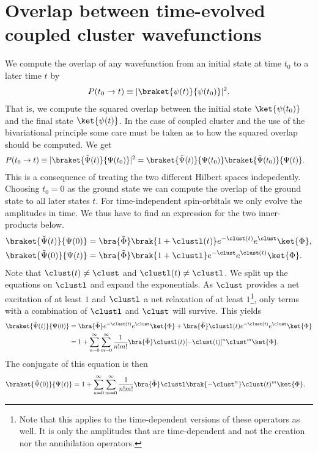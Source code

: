 \chapter{Overlap between time-evolved coupled cluster wavefunctions}
    We compute the overlap of any wavefunction from an initial state at time
    $t_0$ to a later time $t$ by
    \begin{align}
        P(t_0 \to t)
        \equiv |\braket{\psi(t)}{\psi(t_0)}|^2.
    \end{align}
    That is, we compute the squared overlap between the initial state
    $\ket{\psi(t_0)}$ and the final state $\ket{\psi(t)}$. In the case of
    coupled cluster and the use of the bivariational principle some care must be
    taken as to how the squared overlap should be computed. We get
    \begin{align}
        P(t_0 \to t)
        &\equiv |\braket{\tilde{\Psi}(t)}{\Psi(t_0)}|^2
        = \braket{\tilde{\Psi}(t)}{\Psi(t_0)}
        \braket{\tilde{\Psi}(t_0)}{\Psi(t)}.
    \end{align}
    This is a consequence of treating the two different Hilbert spaces
    indepedently.  Choosing $t_0 = 0$ as the ground state we can compute the
    overlap of the ground state to all later states $t$. For time-independent
    spin-orbitals we only evolve the amplitudes in time. We thus have to find an
    expression for the two inner-products below.
    \begin{align}
        \braket{\tilde{\Psi}(t)}{\Psi(0)}
        &=
        \bra{\tilde{\Phi}}\brak{1 + \clustl(t)}e^{-\clust(t)}
        e^{\clust}\ket{\Phi},
        \\
        \braket{\tilde{\Psi}(0)}{\Psi(t)}
        &=
        \bra{\tilde{\Phi}}\brak{1 + \clustl}e^{-\clust}
        e^{\clust(t)}\ket{\Phi}.
    \end{align}
    Note that $\clust(t) \neq \clust$ and $\clustl(t) \neq \clustl$.  We split
    up the equations on $\clustl$ and expand the exponentials. As $\clust$
    provides a net excitation of at least $1$ and $\clustl$ a net relaxation of
    at least $1$\footnote{Note that this applies to the time-dependent versions
    of these operators as well. It is only the amplitudes that are
    time-dependent and not the creation nor the annihilation operators.}, only
    terms with a combination of $\clustl$ and $\clust$ will survive. This yields
    \begin{align}
        \braket{\tilde{\Psi}(t)}{\Psi(0)}
        &=
        \bra{\tilde{\Phi}}e^{-\clust(t)}e^{\clust}\ket{\Phi}
        +
        \bra{\tilde{\Phi}}\clustl(t)e^{-\clust(t)}e^{\clust}\ket{\Phi}
        \\
        &=
        1
        + \sum_{n = 0}^{\infty}\sum_{m = 0}^{\infty}
        \frac{1}{n!m!}
        \bra{\tilde{\Phi}}\clustl(t)[-\clust(t)]^n \clust^m\ket{\Phi}.
    \end{align}
    The conjugate of this equation is then
    \begin{align}
        \braket{\tilde{\Psi}(0)}{\Psi(t)}
        &=
        1 + \sum_{n = 0}^{\infty}\sum_{m = 0}^{\infty}
        \frac{1}{n!m!}
        \bra{\tilde{\Phi}}\clustl \brak{-\clust^n} \clust(t)^m\ket{\Phi}.
    \end{align}

